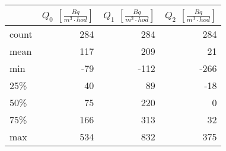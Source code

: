 \begin{tabular}{lrrr}
\toprule
{} &  $Q_0$ $\left[\si{\frac{Bq}{m^3\cdot hod}}\right]$ &  $Q_1$ $\left[\si{\frac{Bq}{m^3\cdot hod}}\right]$ &  $Q_2$ $\left[\si{\frac{Bq}{m^3\cdot hod}}\right]$ \\
\midrule
count &                                                284 &                                                284 &                                                284 \\
mean  &                                                117 &                                                209 &                                                 21 \\
min   &                                                -79 &                                               -112 &                                               -266 \\
25\%   &                                                 40 &                                                 89 &                                                -18 \\
50\%   &                                                 75 &                                                220 &                                                  0 \\
75\%   &                                                166 &                                                313 &                                                 32 \\
max   &                                                534 &                                                832 &                                                375 \\
\bottomrule
\end{tabular}
